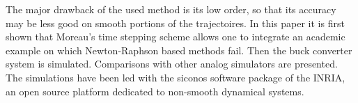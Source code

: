 \documentclass{article}
\begin{document}
The major drawback of the used method is its low order, so that its accuracy may be less good on smooth portions of the trajectoires. In this paper it is first shown that Moreau's time stepping scheme allows one to integrate an academic example on which Newton-Raphson based methods fail. Then the buck converter system is simulated. Comparisons with other analog simulators are presented. The simulations have been led with the {\sc siconos} software package of the INRIA, an open source platform dedicated to non-smooth dynamical systems. 




\end{document}
